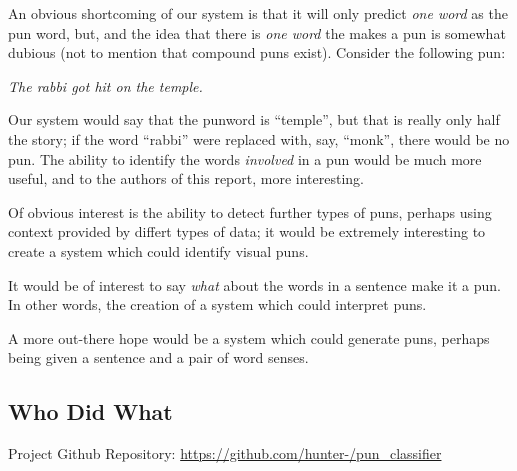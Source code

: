 \documentclass{article}
\begin{document}
An obvious shortcoming of our system is that it will only predict \emph{one
word} as the pun word, but, and the idea that there is \emph{one word} the makes
a pun is somewhat dubious (not to mention that compound puns exist). Consider
the following pun: 
\begin{center}
	\emph{The rabbi got hit on the temple.}
\end{center}
Our system would say that the punword is ``temple'', but that is really only half
the story; if the word ``rabbi'' were replaced with, say, ``monk'', there would
be no pun. The ability to identify the words \emph{involved} in a pun would be
much more useful, and to the authors of this report, more interesting.

Of obvious interest is the ability to detect further types of puns, perhaps
using context provided by differt types of data; it would be extremely
interesting to create a system which could identify visual puns. 

It would be of interest to say \emph{what} about the words in a sentence make it
a pun. In other words, the creation of a system which could interpret puns.

A more out-there hope would be a system which could generate puns, perhaps being
given a sentence and a pair of word senses.

\subsection{Who Did What}

Project Github Repository: \url{https://github.com/hunter-/pun_classifier}
\end{document}
